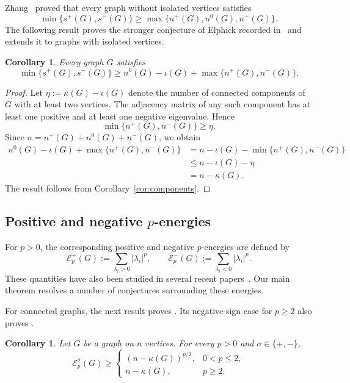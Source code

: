 \documentclass[11pt,letterpaper,reqno]{amsart}
\newtheorem{corollary}[theorem]{Corollary}
\theoremstyle{definition}
\begin{document}
Zhang~\cite[Corollary~1.5]{Zh} proved that every graph without isolated
vertices satisfies
\[
    \min\{s^+(G),s^-(G)\}
    \ge
    \max\{n^+(G),n^0(G),n^-(G)\}.
\]
The following result proves the stronger conjecture of Elphick recorded
in~\cite[Conjecture~7.4]{Zh} and extends it to
graphs with isolated vertices.

\begin{corollary}\label{cor:inertia}
Every graph $G$ satisfies
\[
    \min\{s^+(G),s^-(G)\}
    \ge
    n^0(G)-\iota(G)+\max\{n^+(G),n^-(G)\}.
\]
\end{corollary}

\begin{proof}
Let $\eta:=\kappa(G)-\iota(G)$ denote the number of connected components of $G$ with at least two vertices.  The adjacency matrix
of any such component has at least one positive and at least one negative eigenvalue.
Hence
\[
    \min\{n^+(G),n^-(G)\}\ge \eta.
\]
Since $n=n^+(G)+n^0(G)+n^-(G)$, we obtain
\[
\begin{aligned}
    n^0(G)-\iota(G)+\max\{n^+(G),n^-(G)\}
    &=n-\iota(G)-\min\{n^+(G),n^-(G)\}\\
    &\le n-\iota(G)-\eta\\
    &=n-\kappa(G).
\end{aligned}
\]
The result follows from Corollary~\ref{cor:components}.
\end{proof}



\subsection{Positive and negative \texorpdfstring{$p$}{p}-energies}
For $p>0$, the corresponding positive and negative $p$-energies are
defined by
\[
    \mathcal E_p^+(G)
    :=\sum_{\lambda_i>0}|\lambda_i|^p,
    \qquad
    \mathcal E_p^-(G)
    :=\sum_{\lambda_i<0}|\lambda_i|^p.
\]
These quantities have also been studied in several recent
papers~\cite{AKMPp,CWZ,ETZ,LTPath,TLW}. Our main theorem resolves a number of conjectures surrounding these energies.

For connected graphs, the next result proves
\cite[Conjecture~5.4]{ETZ}.  Its negative-sign case for $p\ge2$ also proves
\cite[Conjecture~2]{AKMPp}.

\begin{corollary}\label{cor:p-energy}
Let $G$ be a graph on $n$ vertices. For every $p>0$ and $\sigma\in\{+,-\}$,
\[
    \mathcal E_p^\sigma(G)\ge
    \begin{cases}
        \left(n-\kappa(G)\right)^{p/2},&0<p\le2,\\[2mm]
        n-\kappa(G),&p\ge2.
    \end{cases}
\]
\end{corollary}
\end{document}
